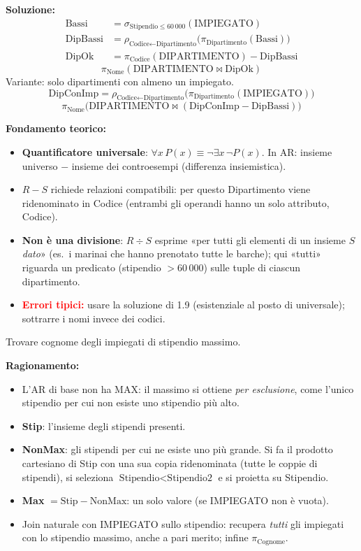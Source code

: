 \documentclass[12pt, a4paper]{article}
\begin{document}
\textbf{Soluzione:}
\begin{align*}
\text{Bassi} &= \sigma_{\text{Stipendio}\leq 60\,000}(\text{IMPIEGATO})\\
\text{DipBassi} &= \rho_{\text{Codice}\leftarrow\text{Dipartimento}}\big(\pi_{\text{Dipartimento}}(\text{Bassi})\big)\\
\text{DipOk} &= \pi_{\text{Codice}}(\text{DIPARTIMENTO})-\text{DipBassi}
\end{align*}
$$\pi_{\text{Nome}}(\text{DIPARTIMENTO}\bowtie\text{DipOk})$$
Variante: solo dipartimenti con almeno un impiegato.
$$\text{DipConImp}=\rho_{\text{Codice}\leftarrow\text{Dipartimento}}\big(\pi_{\text{Dipartimento}}(\text{IMPIEGATO})\big)$$
$$\pi_{\text{Nome}}\big(\text{DIPARTIMENTO}\bowtie(\text{DipConImp}-\text{DipBassi})\big)$$

\textbf{Fondamento teorico:}
\begin{itemize}
\item \textbf{Quantificatore universale}: $\forall x\,P(x)\equiv\neg\exists x\,\neg P(x)$. In AR: insieme universo $-$ insieme dei controesempi (differenza insiemistica).
\item $R-S$ richiede relazioni compatibili: per questo Dipartimento viene ridenominato in Codice (entrambi gli operandi hanno un solo attributo, Codice).
\item \textbf{Non è una divisione}: $R\div S$ esprime «per tutti gli elementi di un insieme $S$ \emph{dato}» (es.\ i marinai che hanno prenotato tutte le barche); qui «tutti» riguarda un predicato (stipendio $>60\,000$) sulle tuple di ciascun dipartimento.
\item \textcolor{red}{\textbf{Errori tipici:}} usare la soluzione di 1.9 (esistenziale al posto di universale); sottrarre i nomi invece dei codici.
\end{itemize}

\begin{tcolorbox}[colback=lightergray!10, colframe=tocsec, title=\textbf{Esercizio 1.11}]
Trovare cognome degli impiegati di stipendio massimo.
\end{tcolorbox}

\textbf{Ragionamento:}
\begin{itemize}
\item L'AR di base non ha MAX: il massimo si ottiene \emph{per esclusione}, come l'unico stipendio per cui non esiste uno stipendio più alto.
\item \textbf{Stip}: l'insieme degli stipendi presenti.
\item \textbf{NonMax}: gli stipendi per cui ne esiste uno più grande. Si fa il prodotto cartesiano di Stip con una sua copia ridenominata (tutte le coppie di stipendi), si seleziona $\text{Stipendio}<\text{Stipendio2}$ e si proietta su Stipendio.
\item \textbf{Max} $=\text{Stip}-\text{NonMax}$: un solo valore (se IMPIEGATO non è vuota).
\item Join naturale con IMPIEGATO sullo stipendio: recupera \emph{tutti} gli impiegati con lo stipendio massimo, anche a pari merito; infine $\pi_{\text{Cognome}}$.
\end{itemize}
\end{document}
